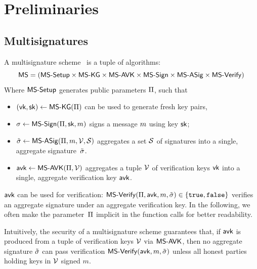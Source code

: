 \section{Preliminaries}\label{sec:prel}

\subsection{Multisignatures}\label{sec:multisig}

A multisignature scheme~\cite{itakura1983public,CCS:MicOhtRey01} is a
tuple of algorithms:
$$
\mathsf{MS} = (\mathsf{MS\textsf{-}{}Setup} \times \allowbreak\mathsf{MS\textsf{-}{}KG} \times \allowbreak\mathsf{MS\textsf{-}{}AVK} \times \allowbreak
\mathsf{MS\textsf{-}{}Sign} \times \allowbreak\mathsf{MS\textsf{-}{}ASig} \times \allowbreak\mathsf{MS\textsf{-}{}Verify})
$$
Where $\mathsf{MS\textsf{-}{}Setup}$ generates public parameters $\Pi$, such that
\begin{itemize}
  \item $(\mathsf{vk},\mathsf{sk}) \gets \mathsf{MS\textsf{-}{}KG}(\Pi)$ can be used to generate fresh key pairs,
  \item $\sigma \gets \mathsf{MS\textsf{-}{}Sign}(\Pi,\mathsf{sk},m)$ signs  a message $m$ using key $\mathsf{sk}$;
  \item $\tilde \sigma \gets \mathsf{MS\textsf{-}{}ASig}(\Pi,m,\mathcal V,\mathcal S)$ aggregates  a
    set $\mathcal S$ of signatures into a single, aggregate signature~$\tilde \sigma$.
  \item $\mathsf{avk} \gets \mathsf{MS\textsf{-}{}AVK}(\Pi,\mathcal V)$ aggregates
  a tuple $\mathcal V$ of verification keys $\mathsf{vk}$ into a single,
  aggregate verification key $\mathsf{avk}$.
\end{itemize}
  $\mathsf{avk}$ can be used for verification:
  $\mathsf{MS\textsf{-}{}Verify}(\Pi,\mathsf{avk},m,\tilde \sigma) \in \{\mathtt{true},\mathtt{false}\}$
  verifies an aggregate signature under an aggregate verification key.
  In the following, we often make the parameter~$\Pi$ implicit in the
    function calls for better readability.

  Intuitively, the security of a multisignature scheme guarantees
  that, if $\mathsf{avk}$ is produced from a tuple of verification keys
  $\mathcal V$ via $\mathsf{MS\textsf{-}{}AVK}$, then no aggregate signature $\tilde \sigma$ can
  pass verification $\mathsf{MS\textsf{-}{}Verify}(\mathsf{avk},m,\tilde \sigma)$ unless all
  honest parties holding keys in $\mathcal V$ signed $m$.

